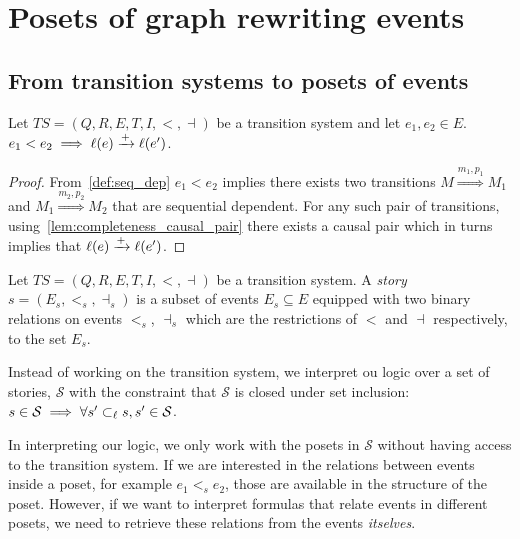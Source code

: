 \section{Posets of graph rewriting events}

\subsection{From transition systems to posets of events}

\begin{lemma}
\label{lemma:pos_infl}
Let $TS = (Q,R,E,T,I,<,\dashv)$ be a transition system and let $e_1,e_2 \in E$.
$e_1< e_2\implies \ell(e)\xrightarrow{+}\ell(e')$.
\end{lemma}
\begin{proof}
  From~\autoref{def:seq_dep} $e_1 < e_2$ implies there exists two transitions $M\overset{m_1,p_1}{\Rightarrow} M_1$ and $M_1\overset{m_2,p_2}{\Rightarrow} M_2$ that are sequential dependent. For any such pair of transitions, using~\autoref{lem:completeness_causal_pair} there exists a causal pair which in turns implies that $\ell(e)\xrightarrow{+}\ell(e')$.
\end{proof}

\begin{definition}[Story]
  Let $TS = (Q,R,E,T,I,<,\dashv)$ be a transition system.
  A \emph{story} $s = (E_s,<_s,\dashv_s)$ is a subset of events $E_s\subseteq E$ equipped with two binary relations on events $<_s$, $\dashv_s$ which are the restrictions of $<$ and $\dashv$ respectively, to the set $E_s$.
\end{definition}

Instead of working on the transition system, we interpret ou logic over a set of stories, $\mathcal{S}$ with the constraint that $\mathcal{S}$ is closed under set inclusion: $s\in \mathcal{S} \implies \forall s'\subset_{\ell} s, s'\in\mathcal{S}$.

\bigskip

In interpreting our logic, we only work with the posets in $\mathcal{S}$ without having access to the transition system. If we are interested in the relations between events inside a poset, for example $e_1<_s e_2$, those are available in the structure of the poset. However, if we want to interpret formulas that relate events in different posets, we need to retrieve these relations from the events \emph{itselves}.

